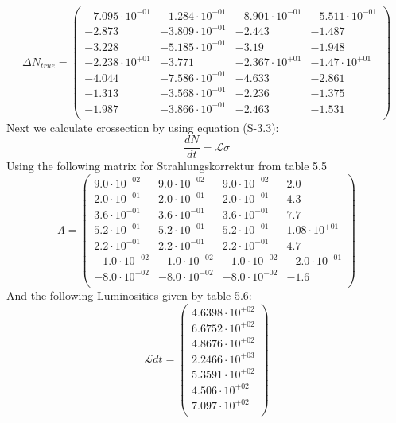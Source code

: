 \documentclass[]{article}
\begin{document}
\begin{equation}
\Delta N_{true} = \begin{pmatrix}
   -7.095\cdot 10^{-01} & -1.284\cdot 10^{-01} & -8.901\cdot 10^{-01} & -5.511\cdot 10^{-01} \\
   -2.873 & -3.809\cdot 10^{-01} & -2.443 & -1.487 \\
   -3.228 & -5.185\cdot 10^{-01} & -3.19 & -1.948 \\
   -2.238\cdot 10^{+01} & -3.771 & -2.367\cdot 10^{+01} & -1.47\cdot 10^{+01} \\
   -4.044 & -7.586\cdot 10^{-01} & -4.633 & -2.861 \\
   -1.313 & -3.568\cdot 10^{-01} & -2.236 & -1.375 \\
   -1.987 & -3.866\cdot 10^{-01} & -2.463 & -1.531 \\
\end{pmatrix}
\end{equation}
Next we calculate crossection by using equation (S-3.3):
\begin{equation}
\frac{dN}{dt} = \mathcal{L}\sigma
\label{eq:cs}
\end{equation}
Using the following matrix for Strahlungskorrektur from table 5.5
\begin{equation}
\Lambda = \begin{pmatrix}
   9.0\cdot 10^{-02} & 9.0\cdot 10^{-02} & 9.0\cdot 10^{-02} & 2.0 \\
   2.0\cdot 10^{-01} & 2.0\cdot 10^{-01} & 2.0\cdot 10^{-01} & 4.3 \\
   3.6\cdot 10^{-01} & 3.6\cdot 10^{-01} & 3.6\cdot 10^{-01} & 7.7 \\
   5.2\cdot 10^{-01} & 5.2\cdot 10^{-01} & 5.2\cdot 10^{-01} & 1.08\cdot 10^{+01} \\
   2.2\cdot 10^{-01} & 2.2\cdot 10^{-01} & 2.2\cdot 10^{-01} & 4.7 \\
   -1.0\cdot 10^{-02} & -1.0\cdot 10^{-02} & -1.0\cdot 10^{-02} & -2.0\cdot 10^{-01} \\
   -8.0\cdot 10^{-02} & -8.0\cdot 10^{-02} & -8.0\cdot 10^{-02} & -1.6 \\
\end{pmatrix}
\end{equation}
And the following Luminosities given by table 5.6:
\begin{equation}
\mathcal{L}dt = \begin{pmatrix}
   4.6398\cdot 10^{+02} \\
   6.6752\cdot 10^{+02} \\
   4.8676\cdot 10^{+02} \\
   2.2466\cdot 10^{+03} \\
   5.3591\cdot 10^{+02} \\
   4.506\cdot 10^{+02} \\
   7.097\cdot 10^{+02} \\
\end{pmatrix}
\end{equation}
\end{document}
